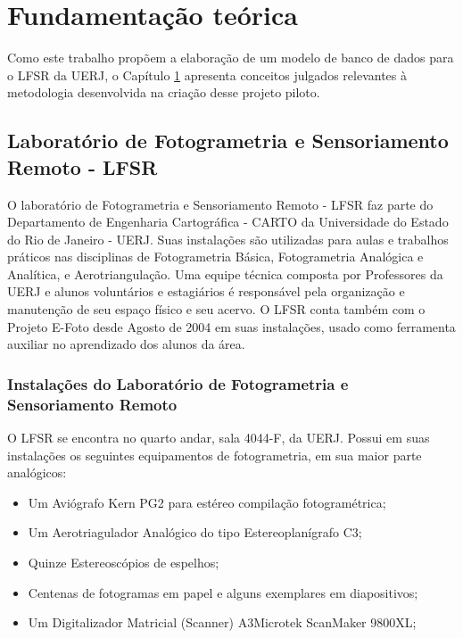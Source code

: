 \chapter{Fundamentação teórica}\label{chp}

Como este trabalho propõem a elaboração de um modelo de banco de dados para o LFSR da UERJ, o Capítulo \ref{chp} apresenta conceitos julgados relevantes à metodologia desenvolvida na criação desse projeto piloto. %



\section{Laboratório de Fotogrametria e Sensoriamento Remoto - LFSR}

O laboratório de Fotogrametria e Sensoriamento Remoto - LFSR faz parte do Departamento de Engenharia Cartográfica - CARTO da Universidade do Estado do Rio de Janeiro - UERJ. Suas instalações são utilizadas para aulas e trabalhos práticos nas disciplinas de Fotogrametria Básica, Fotogrametria Analógica e Analítica, e Aerotriangulação. Uma equipe técnica composta por Professores da UERJ e alunos voluntários e estagiários é responsável pela organização e manutenção de seu espaço físico e seu acervo. O LFSR conta também com o Projeto E-Foto desde Agosto de 2004 em suas instalações, usado como ferramenta auxiliar no aprendizado dos alunos da área.  

\subsection{Instalações do Laboratório de Fotogrametria e Sensoriamento Remoto}

O LFSR se encontra no quarto andar, sala 4044-F, da UERJ. Possui em suas instalações os seguintes equipamentos de fotogrametria, em sua maior parte analógicos: 

\begin{itemize}
    \item Um Aviógrafo Kern PG2 para estéreo compilação fotogramétrica;
    \item Um Aerotriagulador Analógico do tipo Estereoplanígrafo C3;
    \item Quinze Estereoscópios de espelhos;
    \item Centenas de fotogramas em papel e alguns exemplares em diapositivos;
    \item Um Digitalizador Matricial (Scanner) A3Microtek ScanMaker 9800XL;
\end{itemize}

